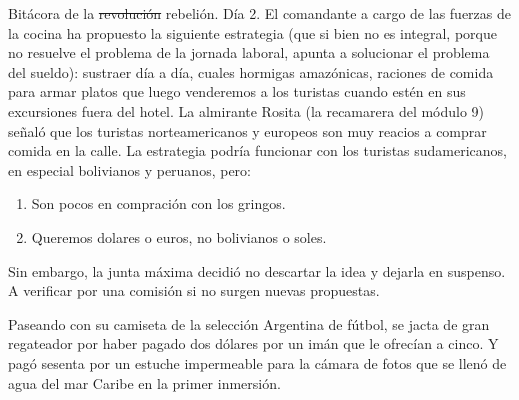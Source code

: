 \documentclass[12pt,twoside,openright,a5paper]{book}
\begin{document}
\vspace{0.5cm}
\hrulefill\hspace{0.2cm} \decofourleft\decofourright \hspace{0.2cm} \hrulefill
\vspace{0.5cm}

Bitácora de la \st{revolución} rebelión. Día 2. El comandante a cargo de las fuerzas de
la cocina ha propuesto la siguiente estrategia (que si bien no es integral,
porque no resuelve el problema de la jornada laboral, apunta a solucionar
el problema del sueldo): sustraer día a día, cuales hormigas amazónicas,
raciones de comida para armar platos que luego venderemos a los turistas
cuando estén en sus excursiones fuera del hotel. La almirante Rosita
(la recamarera del módulo 9) señaló que los turistas norteamericanos
y europeos son muy reacios a comprar comida en la calle. La estrategia
podría funcionar con los turistas sudamericanos, en especial bolivianos
y peruanos, pero:

\begin{enumerate}
\item Son pocos en compración con los gringos.
\item Queremos dolares o euros, no bolivianos o soles.
\end{enumerate}

Sin embargo, la junta máxima decidió no descartar la idea y dejarla en
suspenso. A verificar por una comisión si no surgen nuevas propuestas.


\vspace{0.5cm}
\hrulefill\hspace{0.2cm} \decofourleft\decofourright \hspace{0.2cm} \hrulefill
\vspace{0.5cm}

Paseando con su camiseta de la selección Argentina de fútbol, se jacta de
gran regateador por haber pagado dos dólares por un imán que le ofrecían
a cinco. Y pagó sesenta por un estuche impermeable para la cámara de fotos
que se llenó de agua del mar Caribe en la primer inmersión.


\vspace{0.5cm}
\hrulefill\hspace{0.2cm} \decofourleft\decofourright \hspace{0.2cm} \hrulefill
\vspace{0.5cm}
\end{document}
